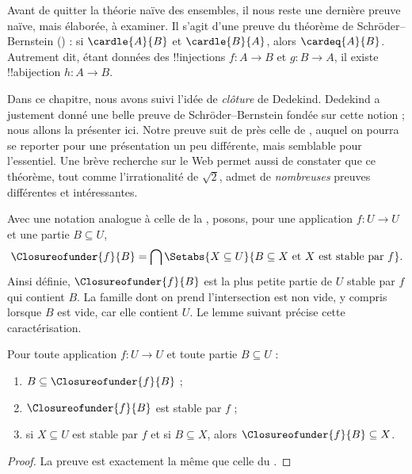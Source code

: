 \documentclass[../../../include/open-logic-section]{subfiles}
\begin{document}


Avant de quitter la théorie naïve des ensembles, il nous reste une
dernière preuve naïve, mais élaborée, à examiner. Il s'agit d'une preuve
du théorème de Schröder--Bernstein
() : si $\cardle{A}{B}$ et
$\cardle{B}{A}$, alors $\cardeq{A}{B}$. Autrement dit, étant données
des !!{injection}s $f\colon A\to B$ et $g\colon B\to A$, il existe
!!a{bijection} $h\colon A\to B$.

Dans ce chapitre, nous avons suivi l'idée de \emph{clôture} de Dedekind.
Dedekind a justement donné une belle preuve de Schröder--Bernstein
fondée sur cette notion ; nous allons la présenter ici. Notre preuve
suit de près celle de \citet[pp.~157--8]{Potter2004}, auquel on pourra
se reporter pour une présentation un peu différente, mais semblable
pour l'essentiel. Une brève recherche sur le Web permet aussi de constater
que ce théorème, tout comme l'irrationalité de $\sqrt{2}$, admet de
\emph{nombreuses} preuves différentes et intéressantes.

Avec une notation analogue à celle de la
, posons, pour une application
$f\colon U\to U$ et une partie $B\subseteq U$,
\[
\Closureofunder{f}{B} = \bigcap \Setabs{X\subseteq U}{B \subseteq X
\text{ et }X\text{ est stable par }f}.
\]
Ainsi définie, $\Closureofunder{f}{B}$ est la plus petite partie de $U$
stable par $f$ qui contient $B$. La famille dont on prend l'intersection
est non vide, y compris lorsque $B$ est vide, car elle contient $U$.
Le lemme suivant précise cette caractérisation.
%
%

\begin{lem}
	Pour toute application $f\colon U\to U$ et toute partie $B\subseteq U$ :
	\begin{enumerate}
		\item{} $B \subseteq \Closureofunder{f}{B}$ ;
		\item{} $\Closureofunder{f}{B}$ est stable par $f$ ;
		\item{} si $X\subseteq U$ est stable par $f$
		et si $B\subseteq X$, alors $\Closureofunder{f}{B}\subseteq X$.
	\end{enumerate}
\end{lem}

\begin{proof}
La preuve est exactement la même que celle du
.
\end{proof}
\end{document}

